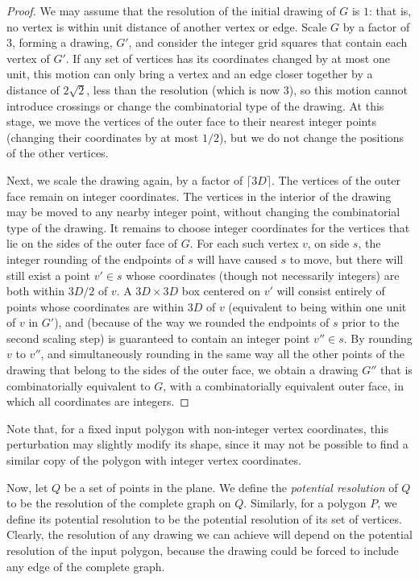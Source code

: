 \documentclass[11pt]{article}
\begin{document}
    \begin {proof}
      We may assume that the resolution of the initial drawing of $G$ is $1$:
      that is, no vertex is within unit distance of another vertex or edge.
      Scale $G$ by a factor of $3$,
      forming a drawing, $G'$, and consider the integer grid squares
      that contain each vertex of $G'$.
      If any set of vertices has its coordinates changed by at most one unit,
      this motion can only bring a vertex
      and an edge closer together by a distance of $2\sqrt 2$,
      less than the resolution (which is now $3$),
      so this motion cannot introduce crossings or change
      the combinatorial type of the drawing.
      At this stage, we move the vertices of the outer face to their
      nearest integer points (changing their coordinates by at most $1/2$),
      but we do not change the positions of the other vertices.

      Next, we scale the drawing again, by a factor of $\lceil 3D\rceil$. The vertices of the outer face remain on integer coordinates. The vertices in the interior of the drawing may be moved to any nearby integer point, without changing the combinatorial type of the drawing. It remains to choose integer coordinates for the vertices that lie on the sides of the outer face of $G$. For each such vertex $v$, on side $s$, the integer rounding of the endpoints of $s$ will have caused $s$ to move, but there will still exist a point $v'\in s$ whose coordinates (though not necessarily integers) are both within $3D/2$ of $v$. A $3D\times 3D$ box centered on $v'$ will consist entirely of points whose coordinates are within $3D$ of $v$ (equivalent to being within one unit of $v$ in $G'$), and (because of the way we rounded the endpoints of $s$ prior to the second scaling step) is guaranteed to contain an integer point $v''\in s$. By rounding $v$ to $v''$, and simultaneously rounding in the same way all the other points of the drawing that belong to the sides of the outer face, we obtain a drawing $G''$ that is combinatorially equivalent to $G$, with a combinatorially equivalent outer face, in which all coordinates are integers.
    \end {proof}

    Note that, for a fixed input polygon with non-integer vertex coordinates, this
    perturbation may slightly modify its shape, since it may not be possible to
    find a similar copy of the polygon with integer vertex coordinates.

    Now, let $Q$ be a set of points in the plane. We define the \emph {potential
    resolution} of $Q$ to be the resolution of the complete graph on $Q$.
    Similarly, for a polygon $P$, we define its potential resolution to be the
    potential resolution of its set of vertices.
    Clearly, the resolution of any drawing we can achieve will depend on the
    potential resolution of the input polygon, because the drawing could be
    forced to include any edge of the complete   graph.
\end{document}
